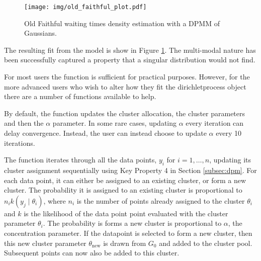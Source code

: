 \documentclass[nojss]{jss}
\begin{document}
\begin{figure}[tb]
\centering
	\texttt{[image: img/old\_faithful\_plot.pdf]}
	\caption{Old Faithful waiting times density estimation with a DPMM of Gaussians. }
	\label{fig:oldfaithful}
\end{figure}
The resulting fit from the model is show in Figure \ref{fig:oldfaithful}. The multi-modal nature has been successfully captured a property that a singular distribution would not find.


For most users the  function is sufficient for practical purposes. However, for the more advanced users who wish to alter how they fit the dirichletprocess object there are a number of functions available to help.

By default, the  function updates the cluster allocation, the cluster parameters and then the $\alpha$ parameter. In some rare cases, updating $\alpha$ every iteration can delay convergence. Instead, the user can instead choose to update $\alpha$ every 10 iterations.
\begin{Schunk}
\end{Schunk}

The function  iterates through all the data points, $y_i$ for $i=1,\ldots,n$, updating its cluster assignment sequentially using Key Property 4 in Section \ref{subsec:dpm}. For each data point, it can either be assigned to an existing cluster, or form a new cluster. The probability it is assigned to an existing cluster is proportional to $n_i k(y _j \mid \theta _{i})$, where $n_i$ is the number of points already assigned to the cluster $\theta _i$ and $k$ is the likelihood of the data point point evaluated with the cluster parameter $\theta _i$. The probability is forms a new cluster is proportional to $\alpha$, the concentration parameter. If the datapoint is selected to form a new cluster, then this new cluster parameter $\theta _{\text{new}}$ is drawn from $G_0$ and added to the cluster pool. Subsequent points can now also be added to this cluster.
\end{document}
